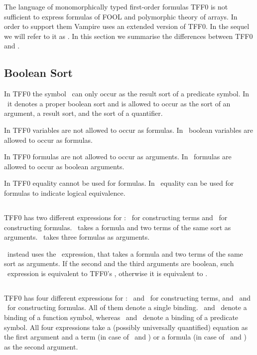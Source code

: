 The language of monomorphically typed first-order formulas TFF0 is not sufficient to express formulas of FOOL and polymorphic theory of arrays. In order to support them Vampire uses an extended version of TFF0. In the sequel we will refer to it as \extTFF. In this section we summarise the differences between TFF0 and \extTFF.

\subsection{Boolean Sort}
In TFF0 the symbol \tptpo\ can only occur as the result sort of a predicate symbol. In \extTFF\ it denotes a proper boolean sort and is allowed to occur as the sort of an argument, a result sort, and the sort of a quantifier.

In TFF0 variables are not allowed to occur as formulas. In \extTFF\ boolean variables are allowed to occur as formulas.

In TFF0 formulas are not allowed to occur as arguments. In \extTFF\ formulas are allowed to occur as boolean arguments.

In TFF0 equality cannot be used for formulas. In \extTFF\ equality can be used for formulas to indicate logical equivalence.

\subsection{\ITE}
TFF0 has two different expressions for \ITE: \ditet\ for constructing terms and \ditef\ for constructing formulas. \ditet\ takes a formula and two terms of the same sort as arguments. \ditef\ takes three formulas as arguments.

\extTFF\ instead uses the \dite\  expression, that takes a formula and two terms of the same sort as arguments. If the second and the third arguments are boolean, such \dite\ expression is equivalent to TFF0's \ditef, otherwise it is equivalent to \ditet.

\subsection{\LETIN}
TFF0 has four different expressions for \LETIN: \dlettt\ and \dletft\ for constructing terms, and \dlettf\ and \dletff\ for constructing formulas. All of them denote a single binding. \dlettt\ and \dlettf\ denote a binding of a function symbol, whereas \dletft\ and \dletff\ denote a binding of a predicate symbol. All four expressions take a (possibly universally quantified) equation as the first argument and a term (in case of \dlettt\ and \dletft) or a formula (in case of \dlettf\ and \dletff) as the second argument.

